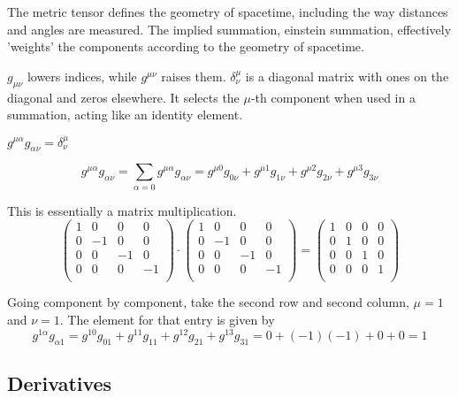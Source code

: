 The metric tensor defines the geometry of spacetime, including the way distances and angles are measured.
The implied summation, einstein summation, effectively 'weights' the components according to the geometry of spacetime.

$g_{\mu\nu}$ lowers indices, while $g^{\mu\nu}$ raises them.
$\delta^{\mu}_{\nu}$ is a diagonal matrix with ones on the diagonal and zeros elsewhere.
It selects the $\mu$-th component when used in a summation, acting like an identity element.

$g^{\mu\alpha} g_{\alpha\nu} = \delta^{\mu}_{\nu}$

$$
g^{\mu\alpha} g_{\alpha\nu} = \sum_{\alpha = 0} g^{\mu\alpha} g_{\alpha\nu} =
g^{\mu 0} g_{0 \nu} + g^{\mu 1} g_{1\nu} + g^{\mu 2} g_{2\nu} + g^{\mu 3} g_{3\nu}
$$

This is essentially a matrix multiplication.
$$
\begin{pmatrix}
    1 & 0  & 0  & 0  \\
    0 & -1 & 0  & 0  \\
    0 & 0  & -1 & 0  \\
    0 & 0  & 0  & -1 \\
\end{pmatrix}
\cdot
\begin{pmatrix}
    1 & 0  & 0  & 0  \\
    0 & -1 & 0  & 0  \\
    0 & 0  & -1 & 0  \\
    0 & 0  & 0  & -1 \\
\end{pmatrix}
=
\begin{pmatrix}
    1 & 0 & 0 & 0 \\
    0 & 1 & 0 & 0 \\
    0 & 0 & 1 & 0 \\
    0 & 0 & 0 & 1 \\
\end{pmatrix}
$$

Going component by component, take the second row and second column, $\mu=1$ and $\nu=1$.
The element for that entry is given by
$$
g^{1\alpha}g_{\alpha 1} =
g^{1 0} g_{0 1} + g^{1 1} g_{1 1} + g^{1 2} g_{2 1} + g^{1 3} g_{3 1}
= 0 + (-1)(-1) + 0 + 0 = 1
$$


\subsection{Derivatives}


